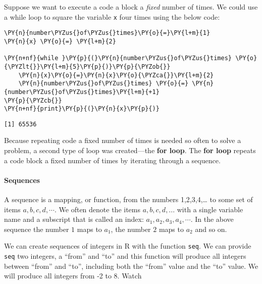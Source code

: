 Suppose we want to execute a code a block a \emph{fixed} number of
times. We could use a while loop to square the variable \texttt{x} four
times using the below code:

    \begin{tcolorbox}[breakable, size=fbox, boxrule=1pt, pad at break*=1mm,colback=cellbackground, colframe=cellborder]
\begin{Verbatim}[commandchars=\\\{\}]
\PY{n}{number\PYZus{}of\PYZus{}times}\PY{o}{=}\PY{l+m}{1}
\PY{n}{x} \PY{o}{=} \PY{l+m}{2}

\PY{n+nf}{while }\PY{p}{(}\PY{n}{number\PYZus{}of\PYZus{}times} \PY{o}{\PYZlt{}}\PY{l+m}{5}\PY{p}{)}\PY{p}{\PYZob{}}
    \PY{n}{x}\PY{o}{=}\PY{n}{x}\PY{o}{\PYZca{}}\PY{l+m}{2}
    \PY{n}{number\PYZus{}of\PYZus{}times} \PY{o}{=} \PY{n}{number\PYZus{}of\PYZus{}times}\PY{l+m}{+1}
\PY{p}{\PYZcb{}}
\PY{n+nf}{print}\PY{p}{(}\PY{n}{x}\PY{p}{)}
\end{Verbatim}
\end{tcolorbox}

    \begin{Verbatim}[commandchars=\\\{\}]
[1] 65536
    \end{Verbatim}

    Because repeating code a fixed number of times is needed so often to
solve a problem, a second type of loop was created---the \textbf{for
loop}. The \textbf{for loop} repeats a code block a fixed number of
times by iterating through a sequence.

\hypertarget{sequences}{%
\paragraph{Sequences}\label{sequences}}

A sequence is a mapping, or function, from the numbers 1,2,3,4,\ldots{}
to some set of items \(a,b,c,d,\cdots\). We often denote the items
\(a,b,c,d,...\) with a single variable name and a subscript that is
called an index: \(a_{1},a_{2},a_{3},a_{4},\cdots\). In the above
sequence the number \(1\) maps to \(a_{1}\), the number \(2\) maps to
\(a_{2}\) and so on.

We can create sequences of integers in R with the function \texttt{seq}.
We can provide \texttt{seq} two integers, a ``from'' and ``to'' and this
function will produce all integers between ``from'' and ``to'',
including both the ``from'' value and the ``to'' value. We will produce
all integers from -2 to 8. Watch

